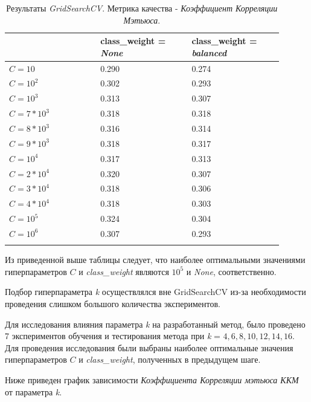 \documentclass[utf8x, 14pt, oneside, a4paper]{article}
\begin{document}
	\begin{center}
		\begin{longtable}[h!]{|p{0.3\linewidth}|p{0.3\linewidth}|p{0.3\linewidth}|}
			\hline
			{} & {class\_weight = \textit{None}} & {class\_weight = \textit{balanced}}\\
			\hline
			{$C = 10$} & {0.290} & {0.274}\\
			\hline
			{$C = 10^2$} & {0.302} & {0.293}\\
			\hline
			{$C = 10^3$} & {0.313} & {0.307}\\
			\hline
			{$C = 7*10^3$} & {0.318} & {0.318}\\
			\hline
			{$C = 8*10^3$} & {0.316} & {0.314}\\
			\hline
			{$C = 9*10^3$} & {0.318} & {0.317}\\
			\hline
			{$C = 10^4$} & {0.317} & {0.313}\\
			\hline
			{$C = 2*10^4$} & {0.320} & {0.307}\\
			\hline
			{$C = 3*10^4$} & {0.318} & {0.306}\\
			\hline
			{$C = 4*10^4$} & {0.318} & {0.303}\\
			\hline
			{$C = 10^5$} & {0.324} & {0.304}\\
			\hline
			{$C = 10^6$} & {0.307} & {0.293}\\
			\hline
			\caption{Результаты \textit{GridSearchCV}. Метрика качества - \textit{Коэффициент Корреляции Мэтьюса}.}
		\end{longtable}
	\end{center}
	Из приведенной выше таблицы следует, что наиболее оптимальными значениями гиперпараметров $C$ и \textit{class\_weight} являются $10^5$ и \textit{None}, соответственно.
	
	Подбор гиперпараметра \textit{k} осуществлялся вне GridSearchCV из-за необходимости проведения слишком большого количества экспериментов.
	
	Для исследования влияния параметра \textit{k} на разработанный метод, было проведено 7 экспериментов обучения и тестирования метода при \linebreak \textit{k} = ${4,6,8,10,12,14,16}$. Для проведения исследования были выбраны наиболее оптимальные значения гиперпараметров $C$ и \textit{class\_weight}, полученных в предыдущем шаге.
	
	\newpage
	
	Ниже приведен график зависимости \textit{Коэффициента Корреляции мэтьюса ККМ} от параметра \textit{k}.
	
\end{document}
